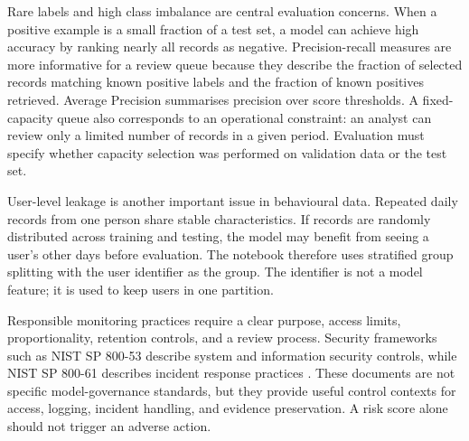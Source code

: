 Rare labels and high class imbalance are central evaluation concerns.
When a positive example is a small fraction of a test set, a model can
achieve high accuracy by ranking nearly all records as negative.
Precision-recall measures are more informative for a review queue
because they describe the fraction of selected records matching known
positive labels and the fraction of known positives retrieved. Average
Precision summarises precision over score thresholds. A fixed-capacity
queue also corresponds to an operational constraint: an analyst can
review only a limited number of records in a given period. Evaluation
must specify whether capacity selection was performed on validation
data or the test set.

User-level leakage is another important issue in behavioural data.
Repeated daily records from one person share stable characteristics.
If records are randomly distributed across training and testing, the
model may benefit from seeing a user's other days before evaluation.
The notebook therefore uses stratified group splitting with the user
identifier as the group. The identifier is not a model feature; it is
used to keep users in one partition.

Responsible monitoring practices require a clear purpose, access
limits, proportionality, retention controls, and a review process.
Security frameworks such as NIST SP 800-53 describe system and
information security controls, while NIST SP 800-61 describes incident
response practices \cite{nist53,nist61}. These documents are not
specific model-governance standards, but they provide useful control
contexts for access, logging, incident handling, and evidence
preservation. A risk score alone should not trigger an adverse action.


